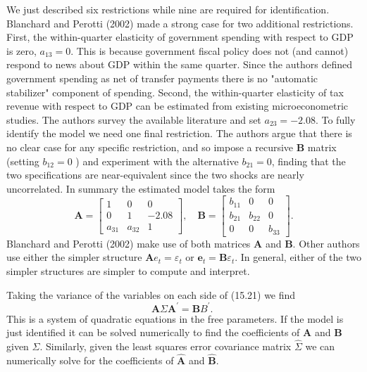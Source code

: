 \documentclass[10pt]{article}
\begin{document}
We just described six restrictions while nine are required for identification. Blanchard and Perotti (2002) made a strong case for two additional restrictions. First, the within-quarter elasticity of government spending with respect to GDP is zero, $a_{13}=0$. This is because government fiscal policy does not (and cannot) respond to news about GDP within the same quarter. Since the authors defined government spending as net of transfer payments there is no "automatic stabilizer" component of spending. Second, the within-quarter elasticity of tax revenue with respect to GDP can be estimated from existing microeconometric studies. The authors survey the available literature and set $a_{23}=-2.08$. To fully identify the model we need one final restriction. The authors argue that there is no clear case for any specific restriction, and so impose a recursive $\boldsymbol{B}$ matrix (setting $b_{12}=0$ ) and experiment with the alternative $b_{21}=0$, finding that the two specifications are near-equivalent since the two shocks are nearly uncorrelated. In summary the estimated model takes the form
$$
\boldsymbol{A}=\left[\begin{array}{ccc}
1 & 0 & 0 \\
0 & 1 & -2.08 \\
a_{31} & a_{32} & 1
\end{array}\right], \quad \boldsymbol{B}=\left[\begin{array}{ccc}
b_{11} & 0 & 0 \\
b_{21} & b_{22} & 0 \\
0 & 0 & b_{33}
\end{array}\right] .
$$
Blanchard and Perotti (2002) make use of both matrices $\boldsymbol{A}$ and $\boldsymbol{B}$. Other authors use either the simpler structure $\boldsymbol{A} e_{t}=\varepsilon_{t}$ or $\boldsymbol{e}_{t}=\boldsymbol{B} \varepsilon_{t}$. In general, either of the two simpler structures are simpler to compute and interpret.

Taking the variance of the variables on each side of (15.21) we find
$$
\boldsymbol{A} \Sigma \boldsymbol{A}^{\prime}=\boldsymbol{B} B^{\prime} \text {. }
$$
This is a system of quadratic equations in the free parameters. If the model is just identified it can be solved numerically to find the coefficients of $\boldsymbol{A}$ and $\boldsymbol{B}$ given $\Sigma$. Similarly, given the least squares error covariance matrix $\widehat{\Sigma}$ we can numerically solve for the coefficients of $\widehat{\boldsymbol{A}}$ and $\widehat{\boldsymbol{B}}$.
\end{document}
